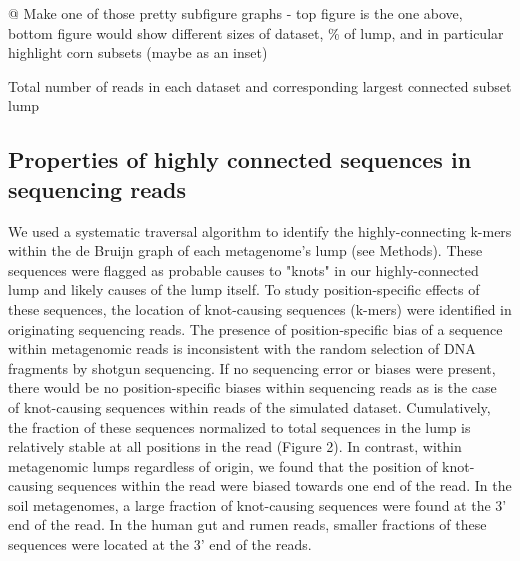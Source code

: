 \documentclass[11pt]{article} %
\begin{document}
@ Make one of those pretty subfigure graphs - top figure is the one above, bottom figure would show different sizes of dataset, \% of lump, and in particular highlight corn subsets (maybe as an inset)

\begin{table}
\caption{Total number of reads in each dataset and corresponding largest connected subset lump}
\end{table}


\subsection{Properties of highly connected sequences in sequencing reads}

We used a systematic traversal algorithm to identify the highly-connecting k-mers within the de Bruijn graph of each metagenome's lump (see Methods).  These sequences were flagged as probable causes to "knots" in our highly-connected lump and likely causes of the lump itself.  To study position-specific effects of these sequences, the location of knot-causing sequences (k-mers) were identified in originating sequencing reads.   
	The presence of position-specific bias of a sequence within metagenomic reads is inconsistent with the random selection of DNA fragments by shotgun sequencing.  If no sequencing error or biases were present, there would be no position-specific biases within sequencing reads as is the case of knot-causing sequences within reads of the simulated dataset.  Cumulatively, the fraction of these sequences normalized to total sequences in the lump is relatively stable at all positions in the read (Figure 2).  In contrast, within metagenomic lumps regardless of origin, we found that the position of knot-causing sequences within the read were biased towards one end of the read.  In the soil metagenomes, a large fraction of knot-causing sequences were found at the 3' end of the read.  In the human gut and rumen reads, smaller fractions of these sequences were located at the 3' end of the reads. 
\end{document}
